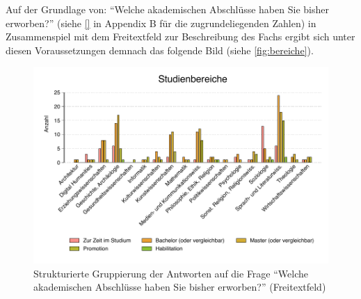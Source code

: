 \documentclass{scrartcl}
\begin{document}
Auf der Grundlage von:
\enquote{Welche akademischen Abschlüsse haben Sie bisher erworben?} (siehe \autoref{} in Appendix B für die zugrundeliegenden Zahlen) in Zusammenspiel mit dem Freitextfeld zur Beschreibung des Fachs ergibt sich unter diesen Voraussetzungen demnach das folgende Bild (siehe \autoref{fig:bereiche}).

\begin{figure}[ht]
   \includegraphics[width=1\textwidth]{bereiche.pdf}
   \caption{Strukturierte Gruppierung der Antworten auf die Frage \enquote{Welche akademischen Abschlüsse haben Sie bisher erworben?} (Freitextfeld)}
   \label{fig:bereiche}
\end{figure}
\end{document}

